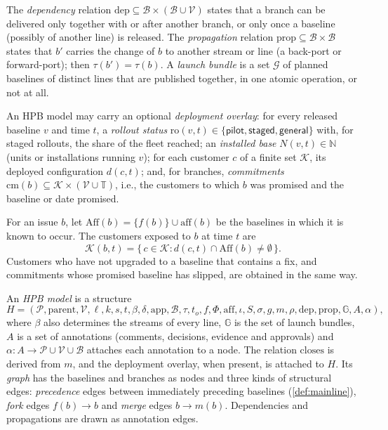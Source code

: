 \begin{definition}
  \label{def:relations}
  The \emph{dependency} relation
  $\mathrm{dep} \subseteq \mathcal{B} \times (\mathcal{B} \cup
  \mathcal{V})$ states that a branch can be delivered only together with
  or after another branch, or only once a baseline (possibly of another
  line) is released. The \emph{propagation} relation
  $\mathrm{prop} \subseteq \mathcal{B} \times \mathcal{B}$ states that
  $b'$ carries the change of $b$ to another stream or line (a back-port or
  forward-port); then $\tau(b') = \tau(b)$. A \emph{launch bundle} is a set
  $\mathcal{G}$ of planned baselines of distinct lines that are published
  together, in one atomic operation, or not at all.
\end{definition}

\begin{definition}
  \label{def:deployment}
  An HPB model may carry an optional \emph{deployment overlay}: for every
  released baseline $v$ and time $t$, a \emph{rollout status}
  $\mathrm{ro}(v,t) \in \{\textsf{pilot}, \textsf{staged}, \textsf{general}\}$
  with, for staged rollouts, the share of the fleet reached; an
  \emph{installed base} $N(v,t) \in \mathbb{N}$ (units or installations
  running $v$); for each customer $c$ of a finite set $\mathcal{K}$, its
  deployed configuration $d(c,t)$; and, for branches, \emph{commitments}
  $\mathrm{cm}(b) \subseteq \mathcal{K} \times (\mathcal{V} \cup
  \mathbb{T})$, i.e., the customers to which $b$ was promised and the
  baseline or date promised.
\end{definition}

For an issue $b$, let $\mathrm{Aff}(b) = \{f(b)\} \cup \mathrm{aff}(b)$
be the baselines in which it is known to occur. The customers exposed to
$b$ at time $t$ are
\[
  \mathcal{K}(b,t) = \{\, c \in \mathcal{K} :
  d(c,t) \cap \mathrm{Aff}(b) \neq \emptyset \,\}.
\]
Customers who have not upgraded to a baseline that contains a fix, and
commitments whose promised baseline has slipped, are obtained in the same
way.

\begin{definition}
  \label{def:model}
  An \emph{HPB model} is a structure
  \[
    H = (\mathcal{P}, \mathrm{parent}, \mathcal{V}, \ell, k, s, t, \beta,
    \delta, \mathrm{app}, \mathcal{B}, \tau, t_o, f, \Phi, \mathrm{aff},
    \iota, S, \sigma, g, m, \rho, \mathrm{dep}, \mathrm{prop},
    \mathbb{G}, A, \alpha),
  \]
  where $\beta$ also determines the streams of every line, $\mathbb{G}$ is
  the set of launch bundles, $A$ is a set of annotations (comments,
  decisions, evidence and approvals) and
  $\alpha\colon A \to \mathcal{P} \cup \mathcal{V} \cup \mathcal{B}$
  attaches each annotation to a node. The relation $\mathrm{closes}$ is
  derived from $m$, and the deployment overlay, when present, is attached
  to $H$. Its \emph{graph} has the baselines and branches as nodes and
  three kinds of structural edges: \emph{precedence} edges between
  immediately preceding baselines (\cref{def:mainline}), \emph{fork} edges
  $f(b) \to b$ and \emph{merge} edges $b \to m(b)$. Dependencies and
  propagations are drawn as annotation edges.
\end{definition}


